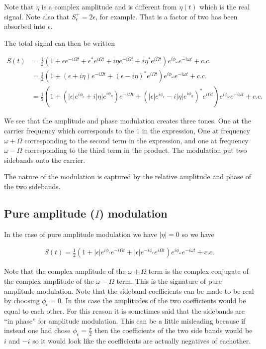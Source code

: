 \documentclass[12pt]{article}
\newcommand{\ep}{\epsilon}
\begin{document}
Note that $\eta$ is a complex amplitude and is different from $\eta(t)$ which is the real signal. Note also that $S_{\ep}^+ = 2\ep$, for example. That is a factor of two has been absorbed into $\ep$.

The total signal can then be written

\begin{align}
S(t) &= \frac{1}{2}\left(1 + \ep e^{-i\Omega t} + \ep^* e^{i\Omega t} + i\eta e^{-i\Omega t} + i\eta^*e^{i\Omega t}\right)e^{i\phi_{\omega}}e^{-i\omega t} + c.c.\\
&=\frac{1}{2}\left(1 + (\ep + i\eta)e^{-i\Omega t} + (\ep - i \eta)^* e^{i\Omega t} \right)e^{i\phi_{\omega}}e^{-i\omega t} + c.c.\\
&= \frac{1}{2}\left(1 + \left(|\ep|e^{i\phi_{\ep}} + i|\eta| e^{i\phi_{\eta}}\right)e^{-i\Omega t} + \left(|\ep|e^{i\phi_{\ep}} - i|\eta|e^{i\phi_{\eta}}\right)^*e^{i\Omega t} \right)e^{i\phi_{\omega}}e^{-i\omega t} + c.c.
\end{align}

We see that the amplitude and phase modulation creates three tones. One at the carrier frequency which corresponds to the $1$ in the expression, One at frequency $\omega + \Omega$ corresponding to the second term in the expression, and one at frequency $\omega - \Omega$ corresponding to the third term in the product. The modulation put two sidebands onto the carrier.

The nature of the modulation is captured by the relative amplitude and phase of the two sidebands. 

\subsection{Pure amplitude ($I$) modulation}
In the case of pure amplitude modulation we have $|\eta|=0$ so we have

\begin{align}
S(t) = \frac{1}{2}\left(1 + |\ep|e^{i\phi_{\ep}}e^{-i\Omega t} + |\ep|e^{-i\phi_{\ep}}e^{i\Omega t} \right)e^{i\phi_{\omega}}e^{-i\omega t} + c.c.
\end{align} 

Note that the complex amplitude of the $\omega + \Omega$ term is the complex conjugate of the complex amplitude of the $\omega - \Omega$ term. This is the signature of pure amplitude modulation. Note that the sideband coefficients can be made to be real by choosing $\phi_{\ep} = 0$. In this case the amplitudes of the two coefficients would be equal to each other. For this reason it is sometimes said that the sidebands are ``in phase'' for amplitude modulation. This can be a little misleading because if instead one had chose $\phi_{\ep} = \frac{\pi}{2}$ then the coefficients of the two side bands would be $i$ and $-i$ so it would look like the coefficients are actually negatives of eachother.
\end{document}
